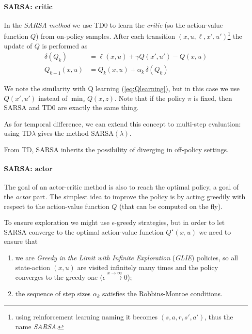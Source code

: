 	\paragraph{SARSA: critic} In the \textit{SARSA method} we use TD0 to learn the \textit{critic} (so the action-value function $Q$) from on-policy samples. After each transition $(x,u,\ell, x',u')$\footnote{using reinforcement learning naming it becomes $(s,a,r,s',a')$, thus the name \textit{SARSA}.} the update of $Q$ is performed as
	\begin{equation}
		\begin{aligned}
			\delta(Q_k) & = \ell(x,u) + \gamma Q(x',u') - Q(x,u) \\
			Q_{k+1}(x,u) & = Q_k(x,u) + \alpha_k\, \delta(Q_k)
		\end{aligned}
	\end{equation}
	
	We note the similarity with Q learning (\ref{eq:Qlearning}), but in this case we use $Q(x',u')$ instead of $\min_z Q(x,z)$. Note that if the policy $\pi$ is fixed, then SARSA and TD0 are exactly the same thing.
	
	As for temporal difference, we can extend this concept to multi-step evaluation: using TD$\lambda$ gives the method SARSA$(\lambda)$. 
	
	From TD, SARSA inherits the possibility of diverging in off-policy settings.
	
	\paragraph{SARSA: actor} The goal of an actor-critic method is also to reach the optimal policy, a goal of the \textit{actor} part. The simplest idea to improve the policy is by acting greedily with respect to the action-value function $Q$ (that can be computed on the fly).
	
	To ensure exploration we might use $\epsilon$-greedy strategies, but in order to let SARSA converge to the optimal action-value function $Q^\star(x,u)$ we need to ensure that
	\begin{enumerate}
		\item we are \textit{Greedy in the Limit with Infinite Exploration} (\textit{GLIE}) policies, so all state-action $(x,u)$ are visited infinitely many times and the policy converges to the greedy one ($\epsilon \xrightarrow{x\rightarrow \infty} 0$);
		\item the sequence of step sizes $\alpha_k$ satisfies the Robbins-Monroe conditions.
	\end{enumerate}
	
	
	
	
	
	
	
	
	
	
	
	
	
	
	
	
	
	
	
	
	
	